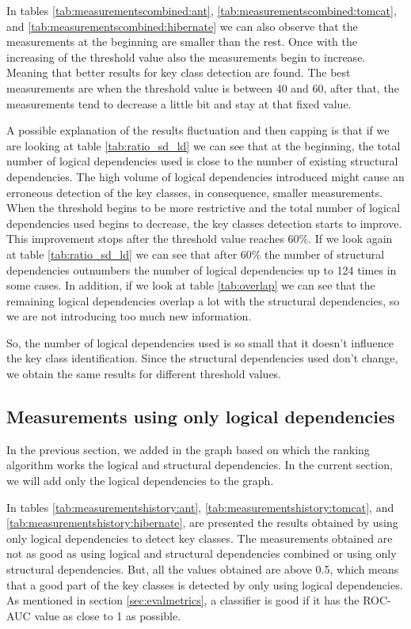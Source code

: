 \documentclass[runningheads]{comsis2}
\begin{document}
In tables \ref{tab:measurementscombined:ant}, \ref{tab:measurementscombined:tomcat}, and \ref{tab:measurementscombined:hibernate} we can also observe that the measurements at the beginning are smaller than the rest. Once with the increasing of the threshold value also the measurements begin to increase. Meaning that better results for key class detection are found. 
The best measurements are when the threshold value is between 40 and 60, after that, the measurements tend to decrease a little bit and stay at that fixed value. 

A possible explanation of the results fluctuation and then capping is that if we are looking at table \ref{tab:ratio_sd_ld} we can see that at the beginning, the total number of logical dependencies used is close to the number of existing structural dependencies. The high volume of logical dependencies introduced might cause an erroneous detection of the key classes, in consequence, smaller measurements. 
When the threshold begins to be more restrictive and the total number of logical dependencies used begins to decrease, the key classes detection starts to improve. This improvement stops after the threshold value reaches 60\%. If we look again at table \ref{tab:ratio_sd_ld} we can see that after 60\% the number of structural dependencies outnumbers the number of logical dependencies up to 124 times in some cases. In addition, if we look at table \ref{tab:overlap} we can see that the remaining logical dependencies overlap a lot with the structural dependencies, so we are not introducing too much new information.

 So, the number of logical dependencies used is so small that it doesn't influence the key class identification. Since the structural dependencies used don't change, we obtain the same results for different threshold values. 




\subsection{Measurements using only logical dependencies}
In the previous section, we added in the graph based on which the ranking algorithm works the logical and structural dependencies. In the current section, we will add only the logical dependencies to the graph.

In tables \ref{tab:measurementshistory:ant}, \ref{tab:measurementshistory:tomcat}, and \ref{tab:measurementshistory:hibernate}, are presented the results obtained by using only logical dependencies to detect key classes. The measurements obtained are not as good as using logical and structural dependencies combined or using only structural dependencies. But, all the values obtained are above 0.5, which means that a good part of the key classes is detected by only using logical dependencies.  As mentioned in section \ref{sec:evalmetrics}, a classifier is good if it has the ROC-AUC value as close to 1 as possible. 
\end{document}
